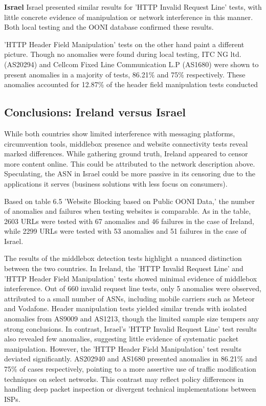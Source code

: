 \large\textbf{Israel}
Israel presented similar results for 'HTTP Invalid Request Line' tests, with little concrete evidence of manipulation or network interference in this manner. Both local testing and the OONI database confirmed these results.

'HTTP Header Field Manipulation' tests on the other hand paint a different picture. Though no anomalies were found during local testing, ITC NG ltd. (AS20294) and Cellcom Fixed Line Communication L.P (AS1680) were shown to present anomalies in a majority of tests, 86.21\% and 75\% respectively. These anomalies accounted for 12.87\% of the header field manipulation tests conducted

\subsection{Conclusions: Ireland versus Israel}
While both countries show limited interference with messaging platforms, circumvention tools, middlebox presence and website connectivity tests reveal marked differences. While gathering ground truth, Ireland appeared to censor more content online. This could be attributed to the network description above. Speculating, the ASN in Israel could be more passive in its censoring due to the applications it serves (business solutions with less focus on consumers). 

Based on table 6.5 'Website Blocking based on Public OONI Data,' the number of anomalies and failures when testing websites is comparable. As in the table, 2603 URLs were tested with 67 anomalies and 46 failures in the case of Ireland, while 2299 URLs were tested with 53 anomalies and 51 failures in the case of Israel.

The results of the middlebox detection tests highlight a nuanced distinction between the two countries. In Ireland, the 'HTTP Invalid Request Line' and 'HTTP Header Field Manipulation' tests showed minimal evidence of middlebox interference. Out of 660 invalid request line tests, only 5 anomalies were observed, attributed to a small number of ASNs, including mobile carriers such as Meteor and Vodafone. Header manipulation tests yielded similar trends with isolated anomalies from AS9009 and AS1213, though the limited sample size tempers any strong conclusions. In contrast, Israel's 'HTTP Invalid Request Line' test results also revealed few anomalies, suggesting little evidence of systematic packet manipulation. However, the 'HTTP Header Field Manipulation' test results deviated significantly. AS202940 and AS1680 presented anomalies in 86.21\% and 75\% of cases respectively, pointing to a more assertive use of traffic modification techniques on select networks. This contrast may reflect policy differences in handling deep packet inspection or divergent technical implementations between ISPs.

